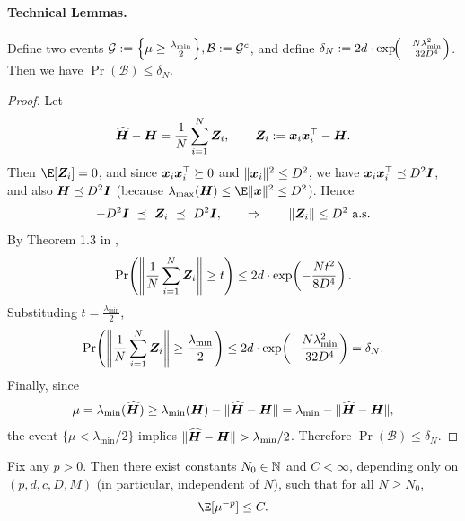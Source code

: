 \paragraph{Technical Lemmas.}
\begin{lemma} \label{lem:small-tail-eigenvalue}
Define two events $\mathcal G:=\Bigl\{\mu\ge \frac{\lambda_{\min}}{2}\Bigr\}, 
\mathcal B:=\mathcal G^{c}$, and define $\delta_N:=2d\cdot \exp\!\Bigl(-\frac{N\lambda_{\min}^2}{32D^4}\Bigr)$. Then we have $\Pr(\mathcal B)\le \delta_N$.
\end{lemma}
\begin{proof}


Let
\[
\widehat{{\bm{H}}}-{\bm{H}}=\frac{1}{N}\sum_{i=1}^N {\bm{Z}}_i,
\qquad
{\bm{Z}}_i:={\bm{x}}_i{\bm{x}}_i^\top-{\bm{H}}.
\]
Then $\E[\mZ_i]=0$, and since ${\bm{x}}_i{\bm{x}}_i^\top\succeq 0$ and $\|{\bm{x}}_i\|^2\le D^2$,
we have ${\bm{x}}_i{\bm{x}}_i^\top\preceq D^2{\bm{I}}$, and also ${\bm{H}}\preceq D^2{\bm{I}}$ (because
$\lambda_{\max}(\mH)\le \E\|\vx\|^2\le D^2$). Hence
\[
-D^2\mI\ \preceq\ \mZ_i\ \preceq\ D^2\mI,
\qquad\Rightarrow\qquad
\|\mZ_i\|\le D^2\ \text{a.s.}
\]
By Theorem 1.3 in \citep{tropp2012user},
\begin{align}
    \Pr\!\left(\left\|\frac{1}{N}\sum_{i=1}^N {\bm{Z}}_i\right\|\ge t\right)
\le
2d\cdot \exp\!\left(-\frac{Nt^2}{8D^4}\right). \label{ineq:hatH-H-error-bound}
\end{align}
Substituding $t=\frac{\lambda_{\min}}{2}$,
\[
\Pr\!\left(\left\|\frac{1}{N}\sum_{i=1}^N {\bm{Z}}_i\right\|\ge \frac{\lambda_{\min}}{2}\right)
\le
2d\cdot \exp\!\left(-\frac{N\lambda_{\min}^2}{32D^4}\right)
=\delta_N.
\]
Finally, since
\[
\mu=\lambda_{\min}(\widehat{{\bm{H}}})
\ge \lambda_{\min}({\bm{H}})-\|\widehat{{\bm{H}}}-{\bm{H}}\|
=\lambda_{\min}-\|\widehat{{\bm{H}}}-{\bm{H}}\|,
\]
the event $\{\mu<\lambda_{\min}/2\}$ implies $\|\widehat{\mH}-\mH\|>\lambda_{\min}/2$.
Therefore $\Pr(\mathcal B)\le \delta_N$.
\end{proof}
\begin{lemma}
\label{lem:eigenvalue-expectation-highd}
Fix any $p>0$. Then there exist constants $N_0\in\mathbb{N}$ and $C<\infty$, depending only on
$(p,d,c,D,M)$ (in particular, independent of $N$), such that for all $N\ge N_0$,
\[
\E[\mu^{-p}] \le C.
\]
\end{lemma}

